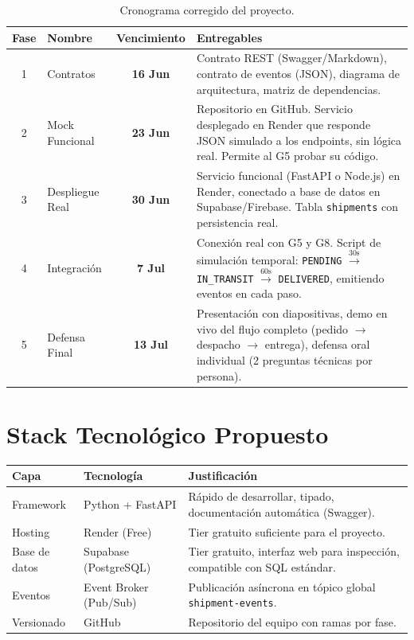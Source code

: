 \documentclass[11pt, a4paper]{article}
\begin{document}
\begin{table}[h!]
\centering
\renewcommand{\arraystretch}{1.5}
\begin{tabularx}{\textwidth}{c l c X}
  \toprule
  \textbf{Fase} & \textbf{Nombre} & \textbf{Vencimiento} & \textbf{Entregables} \\
  \midrule
  1 & Contratos &
    \textbf{16 Jun} &
    Contrato REST (Swagger/Markdown), contrato de eventos (JSON), diagrama de
    arquitectura, matriz de dependencias. \\
  2 & Mock Funcional &
    \textbf{23 Jun} &
    Repositorio en GitHub. Servicio desplegado en Render que responde JSON
    simulado a los endpoints, sin lógica real. Permite al G5 probar su código. \\
  3 & Despliegue Real &
    \textcolor{danger}{\textbf{30 Jun}} &
    Servicio funcional (FastAPI o Node.js) en Render, conectado a base de datos
    en Supabase/Firebase. Tabla \texttt{shipments} con persistencia real. \\
  4 & Integración &
    \textbf{7 Jul} &
    Conexión real con G5 y G8. Script de simulación temporal:
    \texttt{PENDING} $\xrightarrow{\text{30s}}$ \texttt{IN\_TRANSIT}
    $\xrightarrow{\text{60s}}$ \texttt{DELIVERED}, emitiendo eventos en cada paso. \\
  5 & Defensa Final &
    \textbf{13 Jul} &
    Presentación con diapositivas, demo en vivo del flujo completo
    (pedido $\rightarrow$ despacho $\rightarrow$ entrega), defensa oral
    individual (2 preguntas técnicas por persona). \\
  \bottomrule
\end{tabularx}
\caption{Cronograma corregido del proyecto.}
\end{table}


\section{Stack Tecnológico Propuesto}

\begin{table}[h!]
\centering
\renewcommand{\arraystretch}{1.3}
\begin{tabularx}{\textwidth}{l l X}
  \toprule
  \textbf{Capa} & \textbf{Tecnología} & \textbf{Justificación} \\
  \midrule
  Framework    & Python + FastAPI  & Rápido de desarrollar, tipado, documentación automática (Swagger). \\
  Hosting      & Render (Free)     & Tier gratuito suficiente para el proyecto. \\
  Base de datos& Supabase (PostgreSQL) & Tier gratuito, interfaz web para inspección, compatible con SQL estándar. \\
  Eventos      & Event Broker (Pub/Sub) & Publicación asíncrona en tópico global \texttt{shipment-events}. \\
  Versionado   & GitHub            & Repositorio del equipo con ramas por fase. \\
  \bottomrule
\end{tabularx}
\end{table}
\end{document}
